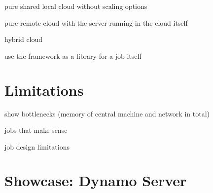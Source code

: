 pure shared local cloud without scaling options

pure remote cloud with the server running in the cloud itself

hybrid cloud

use the framework as a library for a job itself
\section{Limitations}

show bottlenecks (memory of central machine and network in total)

jobs that make sense

job design limitations

\section{Showcase: Dynamo Server}
